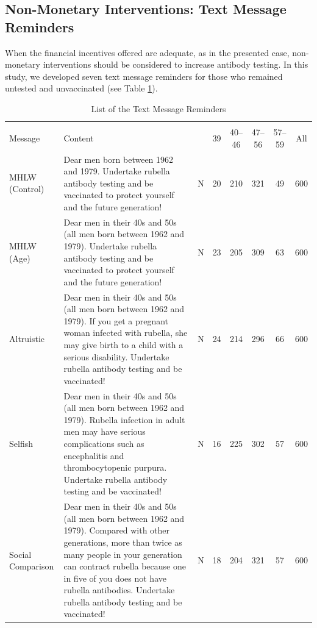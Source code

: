 \documentclass[
      12pt,
    a4paper
]{article}
\begin{document}
\hypertarget{intervention}{%
\subsection{Non-Monetary Interventions: Text Message Reminders}\label{intervention}}

When the financial incentives offered are adequate, as in the presented case, non-monetary interventions should be considered to increase antibody testing. In this study, we developed seven text message reminders for those who remained untested and unvaccinated (see Table \ref{tab:message-list}).

\begin{table}

\caption{\label{tab:message-list}List of the Text Message Reminders}
\centering
\fontsize{9}{11}\selectfont
\begin{tabular}[t]{l>{\raggedright\arraybackslash}p{20em}cccccc}
\toprule
\multicolumn{3}{c}{ } & \multicolumn{4}{c}{Age (as of April 2019)} & \multicolumn{1}{c}{ } \\
\cmidrule(l{3pt}r{3pt}){4-7}
Message & Content &   & 39 & 40--46 & 47--56 & 57--59 & All\\
\midrule
MHLW (Control) & Dear men born between 1962 and 1979. Undertake rubella antibody testing and be vaccinated to protect yourself and the future generation! & N & 20 & 210 & 321 & 49 & 600\\
\addlinespace
MHLW (Age) & Dear men in their 40s and 50s (all men born between 1962 and 1979). Undertake rubella antibody testing and be vaccinated to protect yourself and the future generation! & N & 23 & 205 & 309 & 63 & 600\\
\addlinespace
Altruistic & Dear men in their 40s and 50s (all men born between 1962 and 1979). If you get a pregnant woman infected with rubella, she may give birth to a child with a serious disability. Undertake rubella antibody testing and be vaccinated! & N & 24 & 214 & 296 & 66 & 600\\
\addlinespace
Selfish & Dear men in their 40s and 50s (all men born between 1962 and 1979). Rubella infection in adult men may have serious complications such as encephalitis and thrombocytopenic purpura. Undertake rubella antibody testing and be vaccinated! & N & 16 & 225 & 302 & 57 & 600\\
\addlinespace
Social Comparison & Dear men in their 40s and 50s (all men born between 1962 and 1979). Compared with other generations, more than twice as many people in your generation can contract rubella because one in five of you does not have rubella antibodies. Undertake rubella antibody testing and be vaccinated! & N & 18 & 204 & 321 & 57 & 600\\

\end{tabular}
\end{table}
\end{document}
